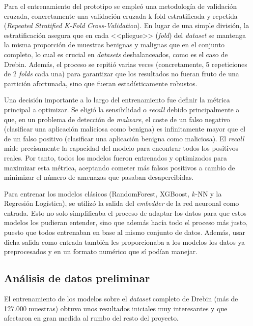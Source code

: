 Para el entrenamiento del prototipo se empleó una metodología de validación cruzada, concretamente una validación cruzada k-fold estratificada y repetida (\textit{Repeated Stratified K-Fold Cross-Validation}). En lugar de una simple división, la estratificación asegura que en cada <<pliegue>> (\textit{fold}) del \textit{dataset} se mantenga la misma proporción de muestras benignas y malignas que en el conjunto completo, lo cual es crucial en \textit{datasets} desbalanceados, como es el caso de Drebin. Además, el proceso se repitió varias veces (concretamente, 5 repeticiones de 2 \textit{folds} cada una) para garantizar que los resultados no fueran fruto de una partición afortunada, sino que fueran estadísticamente robustos.

Una decisión importante a lo largo del entrenamiento fue definir la métrica principal a optimizar. Se eligió la sensibilidad o \textit{recall} debido principalmente a que, en un problema de detección de \textit{malware}, el coste de un falso negativo (clasificar una aplicación maliciosa como benigna) es infinitamente mayor que el de un falso positivo (clasificar una aplicación benigna como maliciosa). El \textit{recall} mide precisamente la capacidad del modelo para encontrar todos los positivos reales. Por tanto, todos los modelos fueron entrenados y optimizados para maximizar esta métrica, aceptando cometer más falsos positivos a cambio de minimizar el número de amenazas que pasaban desapercibidas.

Para entrenar los modelos clásicos (RandomForest, XGBoost, $k$-NN y la Regresión Logística), se utilizó la salida del \textit{embedder} de la red neuronal como entrada. Esto no solo simplificaba el proceso de adaptar los datos para que estos modelos los pudieran entender, sino que además hacía todo el proceso más justo, puesto que todos entrenaban en base al mismo conjunto de datos. Además, usar dicha salida como entrada también les proporcionaba a los modelos los datos ya preprocesados y en un formato numérico que sí podían manejar.

\subsection{Análisis de datos preliminar}

El entrenamiento de los modelos sobre el \textit{dataset} completo de Drebin (más de 127.000 muestras) obtuvo unos resultados iniciales muy interesantes y que afectaron en gran medida al rumbo del resto del proyecto.

